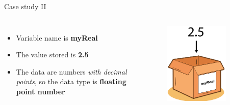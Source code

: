 \documentclass[10pt,xcolor={table,dvipsnames},t]{beamer}
\begin{document}
\begin{frame}{Case study II}
  \begin{columns}
    \begin{itemize}
      \item Variable name is \textbf{myReal}
      \item The value stored is \textbf{2.5}
      \item The data are numbers \textit{with decimal points}, so the data type is \textbf{floating point number}
    \end{itemize}
    \begin{figure}
      \includegraphics[width=0.8\textwidth]{img/variable-float.png}
    \end{figure}
  \end{columns}
\end{frame}
\end{document}
